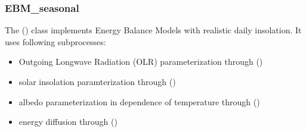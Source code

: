 \documentclass[a4paper,10pt,english]{sphinxmanual}
\begin{document}
\subsubsection{EBM\_seasonal}
\label{models:ebm-seasonal}
The {\hyperref[api/climlab.model:climlab.model.ebm.EBM_seasonal]{\emph{}}} () class implements Energy Balance Models with realistic daily insolation.
It uses following subprocesses:
\begin{itemize}
\item {} 
Outgoing Longwave Radiation (OLR) parameterization through
{\hyperref[api/climlab.radiation:climlab.radiation.AplusBT.AplusBT]{\emph{}}} ()

\item {} 
solar insolation paramterization through
{\hyperref[api/climlab.radiation:climlab.radiation.insolation.DailyInsolation]{\emph{}}} ()

\item {} 
albedo parameterization in dependence of temperature through
{\hyperref[api/climlab.surface:climlab.surface.albedo.StepFunctionAlbedo]{\emph{}}} ()

\item {} 
energy diffusion through
{\hyperref[api/climlab.dynamics:climlab.dynamics.diffusion.MeridionalDiffusion]{\emph{}}} ()

\end{itemize}
\end{document}
